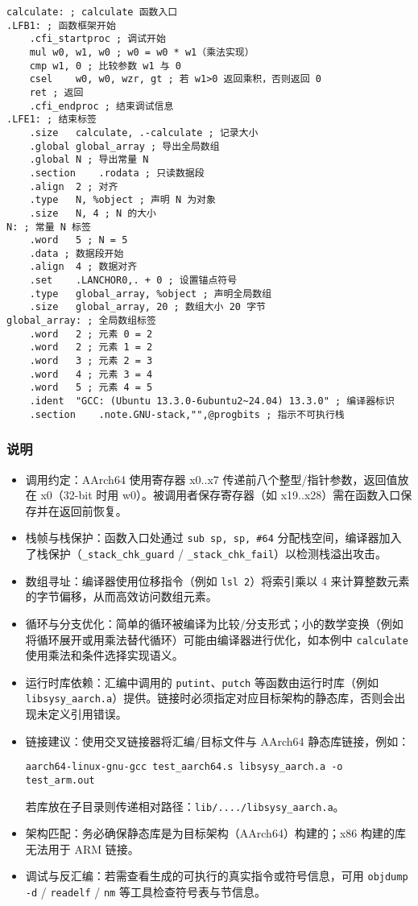 \documentclass[a4paper]{article}
\begin{document}
\begin{lstlisting}[title=逐列访问平凡算法,frame=trbl]
calculate: ; calculate 函数入口
.LFB1: ; 函数框架开始
	.cfi_startproc ; 调试开始
	mul	w0, w1, w0 ; w0 = w0 * w1（乘法实现）
	cmp	w1, 0 ; 比较参数 w1 与 0
	csel	w0, w0, wzr, gt ; 若 w1>0 返回乘积，否则返回 0
	ret ; 返回
	.cfi_endproc ; 结束调试信息
.LFE1: ; 结束标签
	.size	calculate, .-calculate ; 记录大小
	.global	global_array ; 导出全局数组
	.global	N ; 导出常量 N
	.section	.rodata ; 只读数据段
	.align	2 ; 对齐
	.type	N, %object ; 声明 N 为对象
	.size	N, 4 ; N 的大小
N: ; 常量 N 标签
	.word	5 ; N = 5
	.data ; 数据段开始
	.align	4 ; 数据对齐
	.set	.LANCHOR0,. + 0 ; 设置锚点符号
	.type	global_array, %object ; 声明全局数组
	.size	global_array, 20 ; 数组大小 20 字节
global_array: ; 全局数组标签
	.word	2 ; 元素 0 = 2
	.word	2 ; 元素 1 = 2
	.word	3 ; 元素 2 = 3
	.word	4 ; 元素 3 = 4
	.word	5 ; 元素 4 = 5
	.ident	"GCC: (Ubuntu 13.3.0-6ubuntu2~24.04) 13.3.0" ; 编译器标识
	.section	.note.GNU-stack,"",@progbits ; 指示不可执行栈

\end{lstlisting}
\subsubsection{说明}
\begin{itemize}
	\item 调用约定：AArch64 使用寄存器 x0..x7 传递前八个整型/指针参数，返回值放在 x0（32-bit 时用 w0）。被调用者保存寄存器（如 x19..x28）需在函数入口保存并在返回前恢复。
	\item 栈帧与栈保护：函数入口处通过 \texttt{sub sp, sp, \#64} 分配栈空间，编译器加入了栈保护（\texttt{\_stack\_chk\_guard} / \texttt{\_stack\_chk\_fail}）以检测栈溢出攻击。
	\item 数组寻址：编译器使用位移指令（例如 \texttt{lsl 2}）将索引乘以 4 来计算整数元素的字节偏移，从而高效访问数组元素。
	\item 循环与分支优化：简单的循环被编译为比较/分支形式；小的数学变换（例如将循环展开或用乘法替代循环）可能由编译器进行优化，如本例中 \texttt{calculate} 使用乘法和条件选择实现语义。
	\item 运行时库依赖：汇编中调用的 \texttt{putint}、\texttt{putch} 等函数由运行时库（例如 \texttt{libsysy\_aarch.a}）提供。链接时必须指定对应目标架构的静态库，否则会出现未定义引用错误。
	\item 链接建议：使用交叉链接器将汇编/目标文件与 AArch64 静态库链接，例如：
	\begin{verbatim}
aarch64-linux-gnu-gcc test_aarch64.s libsysy_aarch.a -o test_arm.out
	\end{verbatim}
	若库放在子目录则传递相对路径：\texttt{lib/..../libsysy\_aarch.a}。
	\item 架构匹配：务必确保静态库是为目标架构（AArch64）构建的；x86 构建的库无法用于 ARM 链接。
	\item 调试与反汇编：若需查看生成的可执行的真实指令或符号信息，可用 \texttt{objdump -d} / \texttt{readelf} / \texttt{nm} 等工具检查符号表与节信息。
\end{itemize}
\end{document}
